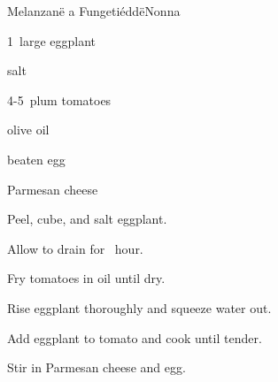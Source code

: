 \begin{recipe}{Melanzan\"e a Fungeti\'edd\"e}{Nonna}{}

\begin{ingredients}
\item 1~large eggplant
\item salt
\item 4-5~plum tomatoes
\item olive oil
\item beaten egg
\item Parmesan cheese
\end{ingredients}

\begin{directions}
\item Peel, cube, and salt eggplant.
\item Allow to drain for \half~hour.
\item Fry tomatoes in oil until dry.
\item Rise eggplant thoroughly and squeeze water out.
\item Add eggplant to tomato and cook until tender.
\item Stir in Parmesan cheese and egg.
\end{directions}

\end{recipe}
